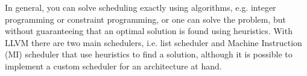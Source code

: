 In general, you can solve scheduling exactly using algorithms, e.g. integer programming or constraint programming, or one can solve the problem, but without guaranteeing that an optimal solution is found using heuristics. With LLVM there are two main schedulers, i.e. list scheduler and Machine Instruction (MI) scheduler that use heuristics to find a solution, although it is possible to implement a custom scheduler for an architecture at hand. 